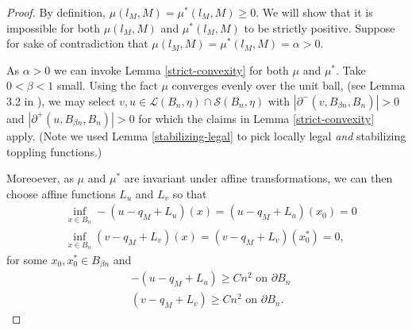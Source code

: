 \documentclass[12pt]{amsart}
\begin{document}
\begin{proof}
	By definition, $\mu(l_M,M) = \mu^*(l_M,M) \geq 0$. We will show that it is impossible for both $\mu(l_M,M)$ and $\mu^*(l_M,M)$ to be strictly positive. Suppose for sake of contradiction that $\mu(l_M, M) = \mu^*(l_M,M) = \alpha > 0$.
	
	
	As $\alpha > 0$ we can invoke Lemma \ref{strict-convexity} for both $\mu$ and $\mu^*$. Take $0 < \beta < 1$ small. Using the fact $\mu$ converges evenly over the unit ball, (see Lemma 3.2 in \cite{armstrong2014stochastic}), 
	we may select $v, u \in \mathcal{L}(B_n, \eta) \cap \mathcal{S}(B_n, \eta)$ 
	with $|\partial^-(v,B_{\beta n},B_n)|>0$ and $|\partial^+(u,B_{\beta n}, B_n)| > 0$
	for which the claims in Lemma \ref{strict-convexity} apply. (Note we used Lemma \ref{stabilizing-legal} to pick locally legal {\it and} stabilizing toppling functions.) 
	
	
	 Moreoever,  as $\mu$ and $\mu^*$ are invariant under affine transformations,  we can then choose affine functions $L_u$ and $L_v$ so that
	\begin{align} \label{positive}
	&\inf_{x \in B_{n}}  -(u - q_{M} + L_u)(x) = (u - q_{M} + L_u)(x_0) = 0 \\
	&\inf_{x \in B_{n}}  (v - q_{M} + L_v)(x) = (v - q_{M} + L_v)(x_0^*) = 0 \nonumber,
	\end{align}
	for some $x_0, x_0^* \in B_{\beta n}$ and 
	\begin{align} \label{curveup}
	& -(u - q_{M} + L_u)  \geq C n^2  \mbox{ on } \partial B_{n}  \\ 
	& (v - q_{M} + L_v)  \geq C n^2  \mbox{ on } \partial B_{n} \nonumber.
	\end{align} 


\end{proof}
\end{document}
